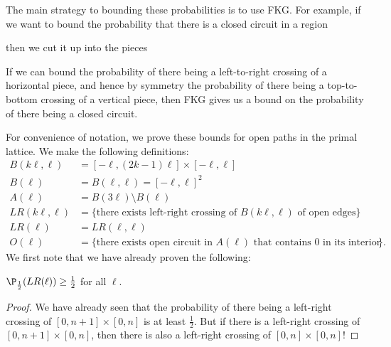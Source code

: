 \documentclass[a4paper]{article}
\begin{document}
The main strategy to bounding these probabilities is to use FKG. For example, if we want to bound the probability that there is a closed circuit in a region
\begin{center}
\end{center}
then we cut it up into the pieces
\begin{center}
\end{center}
If we can bound the probability of there being a left-to-right crossing of a horizontal piece, and hence by symmetry the probability of there being a top-to-bottom crossing of a vertical piece, then FKG gives us a bound on the probability of there being a closed circuit.

For convenience of notation, we prove these bounds for open paths in the primal lattice. We make the following definitions:
\begin{align*}
  B(k\ell, \ell) &= [-\ell, (2k - 1)\ell] \times [-\ell, \ell]\\
  B(\ell) &= B(\ell, \ell) = [-\ell, \ell]^2\\
  A(\ell) &= B(3\ell) \setminus B(\ell)\\
  LR(k\ell ,\ell) &= \{\text{there exists left-right crossing of $B(k\ell, \ell)$ of open edges}\}\\
  LR(\ell) &= LR(\ell, \ell)\\
  O(\ell) &= \{\text{there exists open circuit in $A(\ell)$ that contains $0$ in its interior}\}.
\end{align*}
We first note that we have already proven the following:
\begin{prop}
  $\P_{\frac{1}{2}}(LR(\ell)) \geq \frac{1}{2}$ for all $\ell$.
\end{prop}

\begin{proof}
  We have already seen that the probability of there being a left-right crossing of $[0, n + 1] \times [0, n]$ is at least $\frac{1}{2}$. But if there is a left-right crossing of $[0, n + 1] \times [0, n]$, then there is also a left-right crossing of $[0, n] \times [0, n]$!
\end{proof}
\end{document}

